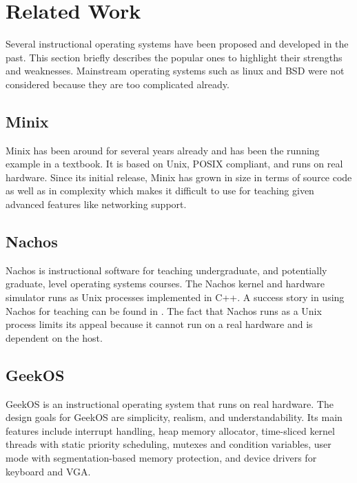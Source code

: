\documentclass{acm_proc_article-sp}
\begin{document}


\section{Related Work}
Several instructional operating systems have been proposed and developed in 
the past\cite{anderson:survey}. This section briefly describes the popular ones to highlight
their strengths and weaknesses. Mainstream operating systems such as linux and
BSD were not considered because they are too complicated already.

\subsection{Minix}
Minix\cite{tanenbaum:minix} has been around for several years already and has 
been the running example in a textbook\cite{tanenbaum:osdai}. It is based
on Unix, POSIX compliant, and runs on real hardware. Since its initial release,
Minix has grown in size in terms of source code as well as in complexity 
which makes it difficult to use for teaching given advanced features like 
networking support.

\subsection{Nachos}
Nachos\cite{christopher:nachos} is instructional software for teaching 
undergraduate, and potentially graduate, level operating systems courses.
The Nachos kernel and hardware simulator runs as Unix processes implemented
in C++. A success story in using Nachos for teaching can be found in 
\cite{gary:nachos}. The fact that Nachos runs as a Unix process limits 
its appeal because it cannot run on a real hardware and is dependent on the
host.

\subsection{GeekOS}
GeekOS\cite{hovemeyer:geekos} is an instructional operating system that
runs on real hardware. The design goals for GeekOS are simplicity, realism,
and understandability. Its main features include interrupt handling, 
heap memory allocator, time-sliced kernel threads with static priority
scheduling, mutexes and condition variables, user mode with segmentation-based
memory protection, and device drivers for keyboard and VGA.
\end{document}
